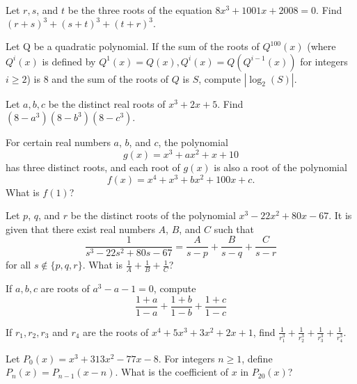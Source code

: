 \documentclass{article}
\begin{document}
\begin{prob}[BMT 2015]{2}
Let $r, s$, and $t$ be the three roots of the equation $8x^3 + 1001x + 2008 = 0$. Find
$(r + s)^3 + (s + t)^3 + (t + r)^3.$
\end{prob}

\begin{prob}[PuMAC 2019]{3}
Let Q be a quadratic polynomial. If the sum of the roots of $Q^{100}(x)$ (where $Q^{i}(x)$ is defined
by $Q^{1}(x) = Q(x), Q^{i}(x) = Q(Q^{i-1}(x))$ for integers $i \ge 2$) is $8$ and the sum of the roots of $Q$
is $S$, compute $|\log_{2}(S)|$.
\end{prob}

\begin{prob}{3}
Let $a,b,c$ be the distinct real roots of $x^3+2x+5$. Find $(8-a^3)(8-b^3)(8-c^3)$.
\end{prob}

\begin{prob}[AMC 10A 2017/24]{3}
For certain real numbers $a$, $b$, and $c$, the polynomial\[g(x) = x^3 + ax^2 + x + 10\]has three distinct roots, and each root of $g(x)$ is also a root of the polynomial\[f(x) = x^4 + x^3 + bx^2 + 100x + c.\]What is $f(1)$?
\end{prob}

\begin{req}[AMC 10A 2019/24]{3}
Let $p$, $q$, and $r$ be the distinct roots of the polynomial $x^3 - 22x^2 + 80x - 67$. It is given that there exist real numbers $A$, $B$, and $C$ such that $$\dfrac{1}{s^3 - 22s^2 + 80s - 67} = \dfrac{A}{s-p} + \dfrac{B}{s-q} + \frac{C}{s-r}$$for all $s\not\in\{p,q,r\}$. What is $\tfrac1A+\tfrac1B+\tfrac1C$?
\end{req}

\begin{prob}[Canada]{3}
If $a,b,c$ are roots of $a^3-a-1=0$, compute
$$\frac{1+a}{1-a}+\frac{1+b}{1-b}+\frac{1+c}{1-c}$$
\end{prob}

\begin{prob}{3}
If $r_{1},r_{2},r_{3}$ and $r_{4}$ are the roots of $x^4+5x^3+3x^2+2x+1$, find $\frac{1}{r_{1}^3}+\frac{1}{r_{2}^3}+\frac{1}{r_{3}^3}+\frac{1}{r_{4}^3}$.
\end{prob}

\begin{prob}[AIME 1993/5]{3}
Let $P_0(x) = x^3 + 313x^2 - 77x - 8$. For integers $n \ge 1$, define $P_n(x) = P_{n - 1}(x - n)$. What is the coefficient of $x$ in $P_{20}(x)$?
\end{prob}
\end{document}
